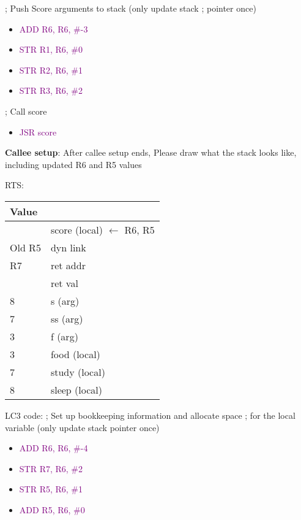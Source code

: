\documentclass{article}
\begin{document}
;  Push Score arguments to stack (only update stack
;  pointer once)
\begin{itemize}
    \item  \textcolor{purple}{ADD R6, R6, \#-3}
    \item   \textcolor{purple}{STR R1, R6, \#0}
    \item    \textcolor{purple}{STR R2, R6, \#1}
    \item     \textcolor{purple}{STR R3, R6, \#2}
    
\end{itemize}
; Call score 
\begin{itemize}
    \item  \textcolor{purple}{JSR score}
    
\end{itemize}

 \textbf{Callee setup}: After callee setup ends, Please draw what the stack looks like, including updated R6 and R5 values 

RTS:
\begin{center}

\begin{tabular}{|p{3cm} p{5cm} |} 
\hline
 Value &   \\ [0.5ex] 
 \hline \hline
 & score (local) $\xleftarrow{}$ R6, R5 \\
 \hline
 Old R5 & dyn link \\
 \hline
 R7 & ret addr \\
 \hline
 & ret val \\
 \hline
 8 & s (arg) \\ 
 \hline
 7 & ss (arg)\\
 \hline
 3 & f (arg) \\
 \hline
 3 & food (local) \\
 \hline
 7 & study (local)\\ [1ex]
 \hline
  8 & sleep (local) \\ [1ex]
  \hline
 
\end{tabular}
\end{center}
 LC3 code:
  \newline
; Set up bookkeeping information and allocate space
\newline
; for the local variable (only update stack pointer once) 
 \begin{itemize}
    \item  \textcolor{purple}{ADD R6, R6, \#-4}
    \item   \textcolor{purple}{STR R7, R6, \#2}
    \item    \textcolor{purple}{STR R5, R6, \#1}
    \item     \textcolor{purple}{ADD R5, R6, \#0}
    
\end{itemize}
\end{document}
